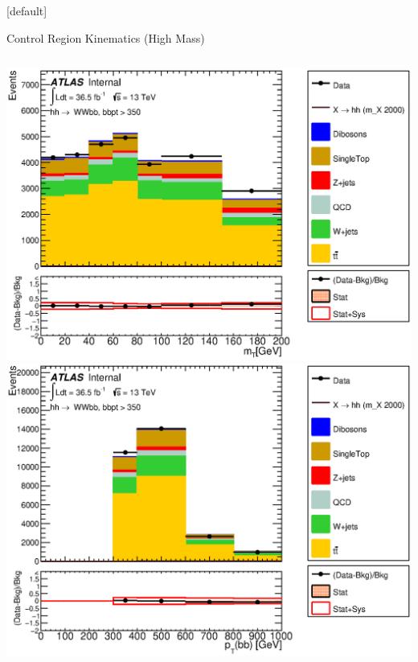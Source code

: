 \documentclass{beamer}
\begin{document}
{  \makeatletter %
  [default]
  \def\beamer@entrycode{\vspace*{-1.075\headheight}}
  \begin{frame}{Control Region Kinematics (High Mass)}
    \vspace{5pt}
    \begin{columns}
      \includegraphics*[width=1.9\textwidth] {../chapters/dihiggs2/figures/ControlPlots/36ifb_CPUpdated_opt2000_mBBcr_plots_103/C_mBBcr_opt2000ichep_bbpt350_wlepmtben_regionA_met25d020}\\
      \includegraphics*[width=1.9\textwidth] {../chapters/dihiggs2/figures/ControlPlots/36ifb_CPUpdated_opt2000_mBBcr_plots_103/C_mBBcr_opt2000ichep_bbpt350_bbPt_regionA_met25d020}

\end{columns}
\end{frame}}
\end{document}
